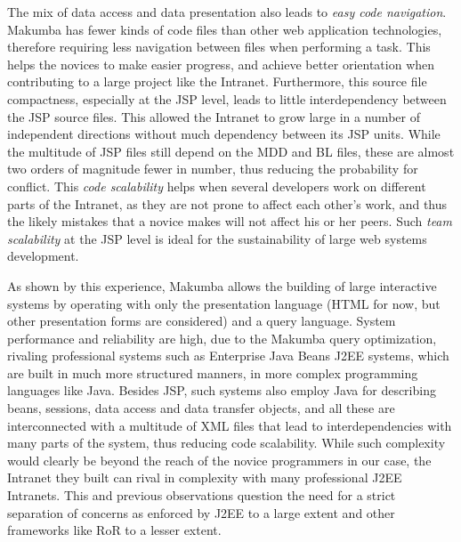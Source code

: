 \documentclass{chi2009}
\begin{document}
The mix of data access and data presentation also leads to \textit{easy code navigation}.  Makumba has fewer kinds of code files than other web application technologies, therefore requiring less navigation between files when performing a task. This helps the novices to make easier progress, and achieve better orientation when contributing to a large project like the Intranet. Furthermore, this source file compactness, especially at the JSP level, leads to little interdependency between the JSP source files. This allowed the Intranet to grow large in a number of independent directions without much dependency between its JSP units. While the multitude of JSP files still depend on the MDD and BL files, these are almost two orders of magnitude fewer in number, thus reducing the probability for conflict. This \textit{code scalability}  helps when several developers work on different parts of the Intranet, as they are not prone to affect each other's work, and thus the likely mistakes that a novice makes will not affect his or her peers. Such \textit{team scalability} at the JSP level is ideal for the sustainability of large web systems development.

As shown by this experience, Makumba allows the building of large interactive systems by operating with only the presentation language (HTML for now, but other presentation forms are considered) and a query language. System performance and reliability are high, due to the Makumba query optimization, rivaling professional systems such as Enterprise Java Beans J2EE systems,  which are built in much more structured manners, in more complex programming languages like Java.  Besides JSP, such systems also employ Java for describing beans, sessions, data access and data transfer objects, and all these are interconnected with a multitude of XML files that lead to interdependencies with many parts of the system, thus reducing code scalability. While such complexity would clearly be beyond the reach of the novice programmers in our case, the Intranet they built can rival in complexity with many professional J2EE Intranets. This and previous observations question the need for a strict separation of concerns as enforced by J2EE to a large extent and other frameworks like RoR to a lesser extent.
\end{document}
